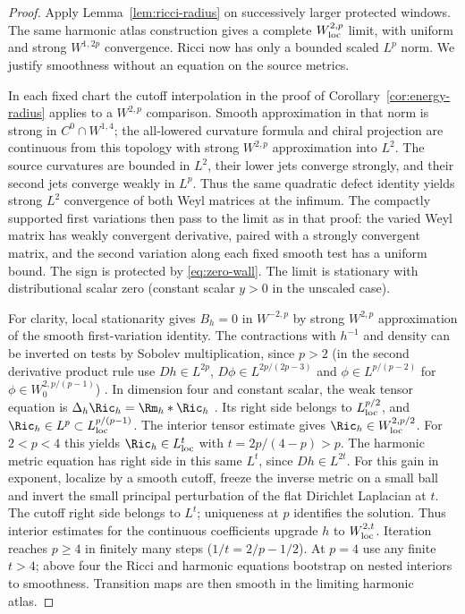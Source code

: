 \begin{proof}
Apply Lemma~\ref{lem:ricci-radius} on successively larger protected
windows. The same harmonic atlas construction gives a complete
\(W^{2,p}_{\rm loc}\) limit, with uniform and strong \(W^{1,2p}\)
convergence. Ricci now has only a bounded scaled \(L^p\) norm.
We justify smoothness without an equation on the source metrics.

In each fixed chart the cutoff interpolation in the proof of
Corollary~\ref{cor:energy-radius} applies to a \(W^{2,p}\) comparison.
Smooth approximation in that norm is strong in \(C^0\cap W^{1,4}\);
the all-lowered curvature formula and chiral projection are continuous
from this topology with strong \(W^{2,p}\) approximation into \(L^2\).
The source curvatures are bounded in \(L^2\), their lower jets converge
strongly, and their second jets converge weakly in \(L^p\). Thus the
same quadratic defect identity yields strong \(L^2\) convergence of both
Weyl matrices at the infimum. The compactly supported first variations
then pass to the limit as in that proof: the varied Weyl matrix has
weakly convergent derivative, paired with a strongly convergent matrix,
and the second variation along each fixed smooth test has a uniform
bound. The sign is protected by \eqref{eq:zero-wall}. The limit is
stationary with distributional scalar zero (constant scalar \(y>0\)
in the unscaled case).

For clarity, local stationarity gives \(B_h=0\) in \(W^{-2,p}\)
by strong \(W^{2,p}\) approximation of the smooth first-variation
identity. The contractions with \(h^{-1}\) and density can be
inverted on tests by Sobolev multiplication, since \(p>2\)
(in the second derivative product rule use \(Dh\in L^{2p}\), \(D\phi\in L^{2p/(2p-3)}\) and \(\phi\in L^{p/(p-2)}\) for \(\phi\in W^{2,p/(p-1)}_0\)) \cite[Lemma 2.1 and proof of Theorem 1.1]{AvalosCogoRoyoAbrego2026Bach}.
In dimension four and constant scalar, the weak tensor equation is
\(\Delta_h\Ric_h=\Rm_h*\Ric_h\)
\cite[Lemma 5.1]{AvalosCogoRoyoAbrego2026Bach}. Its right side
belongs to \(L^{p/2}_{\rm loc}\), and \(\Ric_h\in L^p\subset
L^{p/(p-1)}_{\rm loc}\). The interior tensor estimate
\cite[Theorem 2.2(ii)]{AvalosCogoRoyoAbrego2026Bach} gives
\(\Ric_h\in W^{2,p/2}_{\rm loc}\). For \(2<p<4\) this yields
\(\Ric_h\in L^t_{\rm loc}\) with \(t=2p/(4-p)>p\).
The harmonic metric equation has right side in this same \(L^t\),
since \(Dh\in L^{2t}\). For this gain in exponent, localize by a smooth cutoff, freeze the inverse metric on a small ball and invert the small principal perturbation of the flat Dirichlet Laplacian at \(t\). The cutoff right side belongs to \(L^t\); uniqueness at \(p\) identifies the solution. Thus interior estimates for the
continuous coefficients upgrade \(h\) to \(W^{2,t}_{\rm loc}\).
Iteration reaches \(p\ge4\) in finitely many steps
(\(1/t=2/p-1/2\)). At \(p=4\) use any finite \(t>4\);
above four the Ricci and harmonic equations bootstrap on nested
interiors to smoothness. Transition maps are then smooth in the
limiting harmonic atlas.


\end{proof}
